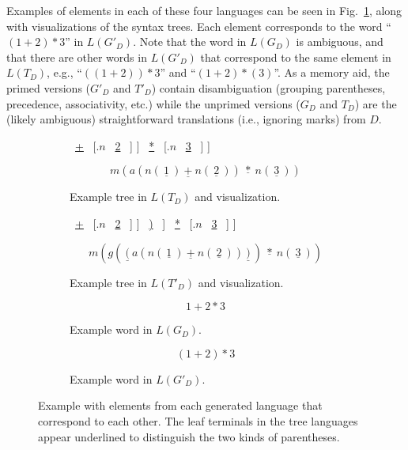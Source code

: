 \documentclass[acmsmall,review,anonymous]{acmart}\settopmatter{printfolios=true,printccs=false,printacmref=false}
\begin{document}
Examples of elements in each of these four languages can be seen in Fig.~\ref{fig:example-words-in-square}, along with visualizations of the syntax trees. Each element corresponds to the word ``$(1 + 2) * 3$'' in $L(G'_D)$. Note that the word in $L(G_D)$ is ambiguous, and that there are other words in $L(G'_D)$ that correspond to the same element in $L(T_D)$, e.g., ``$((1 + 2)) * 3$'' and ``$(1 + 2) * (3)$''. As a memory aid, the primed versions ($G'_D$ and $T'_D$) contain disambiguation (grouping parentheses, precedence, associativity, etc.) while the unprimed versions ($G_D$ and $T_D$) are the (likely ambiguous) straightforward translations (i.e., ignoring marks) from $D$.

{
\newcommand{\terminal}[1]{\ \underline{#1}\ }

\begin{figure}
  \begin{subfigure}[b]{.45\linewidth}
    \begin{center}
    \Tree [.{$m$}
        [.{$a$}
          [.{$n$} \terminal{1} ]
          \terminal{+}
          [.{$n$} \terminal{2} ] ]
        \terminal{*}
        [.{$n$} \terminal{3} ] ]
    \end{center}
    \[m(a(n(\terminal{1}) \terminal{+} n(\terminal{2})) \terminal{*} n(\terminal{3}))\]
    \caption{Example tree in $L(T_D)$ and visualization.}
  \end{subfigure}
  \begin{subfigure}[b]{.45\linewidth}
    \begin{center}
    \Tree [.{$m$}
        [.{$g$}
          \terminal{(}
          [.{$a$}
            [.{$n$} \terminal{1} ]
            \terminal{+}
            [.{$n$} \terminal{2} ] ]
          \terminal{)} ]
        \terminal{*}
        [.{$n$} \terminal{3} ] ]
    \end{center}
    \[m(g( \terminal{(} a(n( \terminal{1} ) \terminal{+} n( \terminal{2} )) \terminal{)} ) \terminal{*} n( \terminal{3} ))\]
    \caption{Example tree in $L(T'_D)$ and visualization.}
  \end{subfigure}

  \begin{subfigure}[b]{.40\linewidth}
    \[1 + 2 * 3\]
    \caption{Example word in $L(G_D)$.}
  \end{subfigure}
  \begin{subfigure}[b]{.40\linewidth}
    \[(1 + 2) * 3\]
    \caption{Example word in $L(G'_D)$.}
  \end{subfigure}
  \caption{Example with elements from each generated language that correspond to each other. The leaf terminals in the tree languages appear underlined to distinguish the two kinds of parentheses.}
  \label{fig:example-words-in-square}
\end{figure}
}
\end{document}
